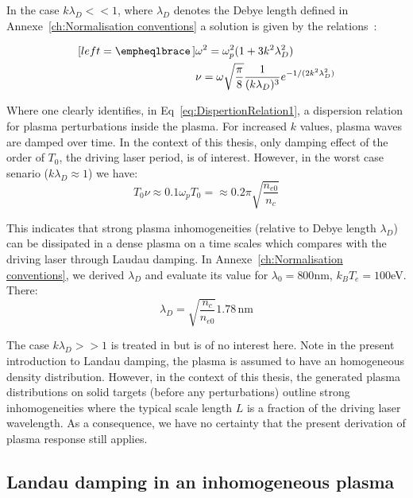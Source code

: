 \noindent In the case $k \lambda_D << 1$, where $\lambda_D$ denotes the Debye length defined in Annexe~\ref{ch:Normalisation conventions} a solution is given by the relations~\cite{vlasov1945theory}:

\begin{subequations}
\label{eq:DispertionRelation}
\begin{align}[left = \empheqlbrace\,]
     &\omega^2 = \omega_p^2(1+3k^2\lambda_D^2)\label{eq:DispertionRelation1}\\
     & \nu = \omega \sqrt{\frac{\pi}{8}}\frac{1}{(k\lambda_D)^{3}}e^{-1/(2k^2\lambda_D^2)} \label{eq:DispertionRelation2}
\end{align}
\end{subequations}

\noindent Where one clearly identifies, in Eq~\ref{eq:DispertionRelation1}, a dispersion relation for plasma perturbations inside the plasma. For increased $k$ values, plasma waves are damped over time. 
In the context of this thesis, only damping effect of the order of $T_0$, the driving laser period, is of interest. However, in the worst case senario ($k\lambda_D\approx 1$) we have:
$$
T_0 \nu \approx 0.1 \omega_p T_0 = \approx 0.2 \pi \sqrt{\frac{n_{e0}}{n_{c}}}
$$

\noindent This indicates that strong plasma inhomogeneities (relative to Debye length $\lambda_D$) can be dissipated in a dense plasma on a time scales which compares with the driving laser through Laudau damping. In Annexe~\ref{ch:Normalisation conventions}, we derived $\lambda_D$ and evaluate its value for $\lambda_0 = 800$nm, $k_BT_e = 100$eV. There:
\begin{equation}
\lambda_D = \sqrt{\frac{n_c}{n_{e0}}}1.78\,\mathrm{nm}
\end{equation}

\noindent The case $k \lambda_D >> 1$ is treated in \cite{landau1946vibrations} but is of no interest here. Note in the present introduction to Landau damping, the plasma is assumed to have an homogeneous density distribution. However, in the context of this thesis,
the generated plasma distributions on solid targets (before any perturbations) outline strong inhomogeneities where the typical scale length $L$ is a fraction of the driving laser wavelength. As a consequence, we have no certainty that the present derivation of plasma response still applies. 

\subsection{Landau damping in an inhomogeneous plasma}

